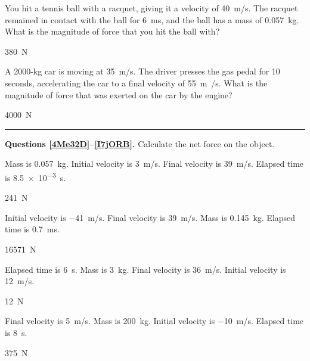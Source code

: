 \documentclass[]{exam}
\begin{document}
\begin{questions}
\question \label{R5mamD}
You hit a tennis ball with a racquet, giving it a velocity of \SI{40}{m/s}. The racquet remained in contact with the ball for \SI{6}{ms}, and the ball has a mass of \SI{0.057}{kg}. What is the magnitude of force that you hit the ball with?

\begin{solution}
\SI{380}{N}
\end{solution}


\question \label{rVq3Tj}
A 2000-kg car is moving at \SI{35}{m/s}. The driver presses the gas pedal for 10 seconds, accelerating the car to a final velocity of \SI{55}{m/}s. What is the magnitude of force that was exerted on the car by the engine?

\begin{solution}
\SI{4000}{N}
\end{solution}

\bigskip
\hrule

\begin{EnvUplevel}
    \textbf{Questions \ref{4Me32D}--\ref{I7jORB}.} Calculate the net force on the object.
\end{EnvUplevel}

\question \label{4Me32D}
Mass is \SI{0.057}{kg}. Initial velocity is \SI{3}{m/s}. Final velocity is \SI{39}{m/s}. Elapsed time is \SI{8.5e-3}{s}.

\begin{solution}
\SI{241}{N}
\end{solution}

\question \label{LKi6tV}
Initial velocity is \SI{-41}{m/s}. Final velocity is \SI{39}{m/s}. Mass is \SI{0.145}{kg}. Elapsed time is \SI{0.7}{ms}.

\begin{solution}
\SI{16571}{N}
\end{solution}

\question \label{uWU1Cn}
Elapsed time is \SI{6}{s}. Mass is \SI{3}{kg}. Final velocity is \SI{36}{m/s}. Initial velocity is \SI{12}{m/s}.

\begin{solution}
\SI{12}{N}
\end{solution}

\question \label{2doawd}
Final velocity is \SI{5}{m/s}. Mass is \SI{200}{kg}. Initial velocity is \SI{-10}{m/s}.  Elapsed time is \SI{8}{s}.

\begin{solution}
\SI{375}{N}
\end{solution}


\end{questions}
\end{document}
